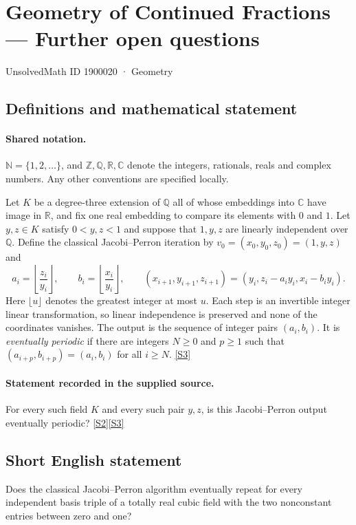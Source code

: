 \documentclass[11pt]{book}
\newcommand{\sref}[2]{\hyperlink{source:#1:#2}{[S#2]}}
\begin{document}
\setcounter{section}{1900019}
\section{Geometry of Continued Fractions — Further open questions}\label{1900020}
{\small\sffamily UnsolvedMath ID 1900020 · Geometry}
\subsection{Definitions and mathematical statement}

\paragraph{Shared notation.}$\mathbb N=\{1,2,\ldots\}$, and $\mathbb Z,\mathbb Q,\mathbb R,\mathbb C$ denote the integers, rationals, reals and complex numbers. Any other conventions are specified locally.


Let $K$ be a degree-three extension of $\mathbb Q$ all of whose embeddings into $\mathbb C$ have image in $\mathbb R$, and fix one real embedding to compare its elements with $0$ and $1$. Let $y,z\in K$ satisfy $0<y,z<1$ and suppose that $1,y,z$ are linearly independent over $\mathbb Q$. Define the classical Jacobi--Perron iteration by $v_0=(x_0,y_0,z_0)=(1,y,z)$ and
\[
 a_i=\left\lfloor\frac{z_i}{y_i}\right\rfloor,\qquad
 b_i=\left\lfloor\frac{x_i}{y_i}\right\rfloor,\qquad
 (x_{i+1},y_{i+1},z_{i+1})=(y_i,z_i-a_i y_i,x_i-b_i y_i).
\]
Here $\lfloor u\rfloor$ denotes the greatest integer at most $u$. Each step is an invertible integer linear transformation, so linear independence is preserved and none of the coordinates vanishes. The output is the sequence of integer pairs $(a_i,b_i)$. It is \emph{eventually periodic} if there are integers $N\ge0$ and $p\ge1$ such that $(a_{i+p},b_{i+p})=(a_i,b_i)$ for all $i\ge N$. \sref{1900020}{3}
\paragraph{Statement recorded in the supplied source.}
For every such field $K$ and every such pair $y,z$, is this Jacobi--Perron output eventually periodic? \sref{1900020}{2}\sref{1900020}{3}
\subsection{Short English statement}
Does the classical Jacobi--Perron algorithm eventually repeat for every independent basis triple of a totally real cubic field with the two nonconstant entries between zero and one?
\end{document}
